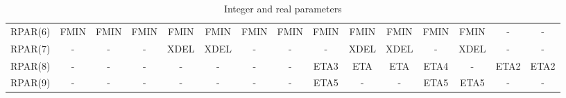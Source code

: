 \documentclass{esub2acm}
\begin{document}
\begin{table}[h]
{\begin{tabular}{c|*{14}c}
RPAR(6) & FMIN & FMIN & FMIN & FMIN & FMIN & FMIN & FMIN & FMIN & FMIN & FMIN & FMIN & FMIN & -    & -    \\
RPAR(7) & -    & -    & -    & XDEL & XDEL & -    & -    & -    & XDEL & XDEL & -    & XDEL & -    & -    \\
RPAR(8) & -    & -    & -    & -    & -    & -    & -    & ETA3 & ETA  & ETA  & ETA4 & -    & ETA2 & ETA2 \\
RPAR(9) & -    & -    & -    & -    & -    & -    & -    & ETA5 & -    & -    & ETA5 & ETA5 & -    & -    \\ \hline
\end{tabular}
}
\caption{Integer and real parameters}
\label{parameters}
\end{table}

\rm
\newpage
\small
\end{document}
